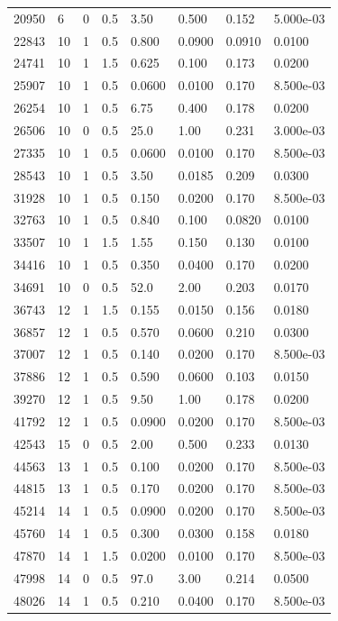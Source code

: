 \documentclass[preview]{standalone}
\begin{document}
{{\begin{tabular}{L{1.2cm}C{1.2cm} C{0.3cm}C{0.5cm} C{1.4cm}C{1.4cm} C{1.4cm}C{1.4cm}}
  20950  &     6  & 0     & 0.5 &  3.50  & 0.500  & 0.152 &  5.000e-03   \\ 
  22843  &    10  & 1     & 0.5 &  0.800  & 0.0900  & 0.0910 &  0.0100   \\ 
  24741  &    10  & 1     & 1.5 &  0.625  & 0.100  & 0.173 &  0.0200   \\ 
  25907  &    10  & 1     & 0.5 &  0.0600  & 0.0100  & 0.170 &  8.500e-03   \\ 
  26254  &    10  & 1     & 0.5 &  6.75  & 0.400  & 0.178 &  0.0200   \\ 
  26506  &    10  & 0     & 0.5 &  25.0  & 1.00  & 0.231 &  3.000e-03   \\ 
  27335  &    10  & 1     & 0.5 &  0.0600  & 0.0100  & 0.170 &  8.500e-03   \\ 
  28543  &    10  & 1     & 0.5 &  3.50  & 0.0185  & 0.209 &  0.0300   \\ 
  31928  &    10  & 1     & 0.5 &  0.150  & 0.0200  & 0.170 &  8.500e-03   \\ 
  32763  &    10  & 1     & 0.5 &  0.840  & 0.100  & 0.0820 &  0.0100   \\ 
  33507  &    10  & 1     & 1.5 &  1.55  & 0.150  & 0.130 &  0.0100   \\ 
  34416  &    10  & 1     & 0.5 &  0.350  & 0.0400  & 0.170 &  0.0200   \\ 
  34691  &    10  & 0     & 0.5 &  52.0  & 2.00  & 0.203 &  0.0170   \\ 
  36743  &    12  & 1     & 1.5 &  0.155  & 0.0150  & 0.156 &  0.0180   \\ 
  36857  &    12  & 1     & 0.5 &  0.570  & 0.0600  & 0.210 &  0.0300   \\ 
  37007  &    12  & 1     & 0.5 &  0.140  & 0.0200  & 0.170 &  8.500e-03   \\ 
  37886  &    12  & 1     & 0.5 &  0.590  & 0.0600  & 0.103 &  0.0150   \\ 
  39270  &    12  & 1     & 0.5 &  9.50  & 1.00  & 0.178 &  0.0200   \\ 
  41792  &    12  & 1     & 0.5 &  0.0900  & 0.0200  & 0.170 &  8.500e-03   \\ 
  42543  &    15  & 0     & 0.5 &  2.00  & 0.500  & 0.233 &  0.0130   \\ 
  44563  &    13  & 1     & 0.5 &  0.100  & 0.0200  & 0.170 &  8.500e-03   \\ 
  44815  &    13  & 1     & 0.5 &  0.170  & 0.0200  & 0.170 &  8.500e-03   \\ 
  45214  &    14  & 1     & 0.5 &  0.0900  & 0.0200  & 0.170 &  8.500e-03   \\ 
  45760  &    14  & 1     & 0.5 &  0.300  & 0.0300  & 0.158 &  0.0180   \\ 
  47870  &    14  & 1     & 1.5 &  0.0200  & 0.0100  & 0.170 &  8.500e-03   \\ 
  47998  &    14  & 0     & 0.5 &  97.0  & 3.00  & 0.214 &  0.0500   \\ 
  48026  &    14  & 1     & 0.5 &  0.210  & 0.0400  & 0.170 &  8.500e-03   \\ 
\hline 
\end{tabular} 

}}
\end{document}

